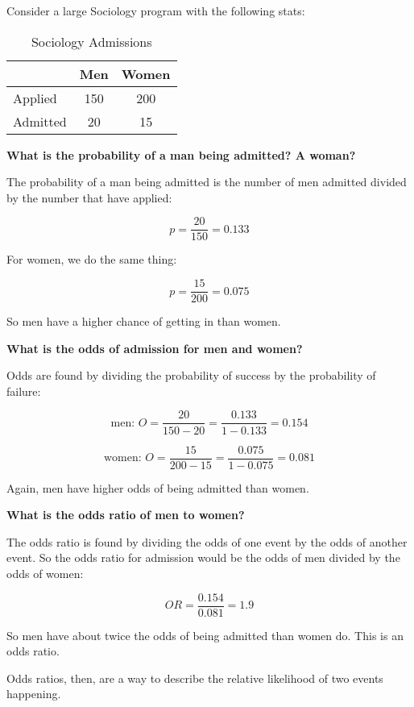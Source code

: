 \documentclass[11pt]{amsart}
\begin{document}
Consider a large Sociology program with the following stats:

\begin{table}[htb]
\caption{Sociology Admissions\label{tab:admin}}
\begin{tabular}{l c c}
\hline
& Men & Women\\ \hline
Applied & 150 & 200\\
Admitted & 20 & 15\\
\hline
\end{tabular}
\end{table}

\textbf{What is the probability of a man being admitted? A woman?}

The probability of a man being admitted is the number of men admitted divided by the number that have applied:

\[ p = \frac{20}{150} = 0.133 \]

For women, we do the same thing:

\[ p = \frac{15}{200} = 0.075 \]

So men have a higher chance of getting in than women.

\textbf{What is the odds of admission for men and women?}

Odds are found by dividing the probability of success by the probability of failure:

\[ \text{men: } O = \frac{20}{150-20} = \frac{0.133}{1-0.133} = 0.154 \]

\[ \text{women: } O = \frac{15}{200-15} = \frac{0.075}{1-0.075} =  0.081 \]

Again, men have higher odds of being admitted than women.

\textbf{What is the odds ratio of men to women?}

The odds ratio is found by dividing the odds of one event by the odds of another event. So the odds ratio for admission would be the odds of men divided by the odds of women:

\[ OR = \frac{0.154}{0.081} = 1.9 \]

So men have about twice the odds of being admitted than women do. This is an odds ratio.

Odds ratios, then, are a way to describe the relative likelihood of two events happening. 
\end{document}
